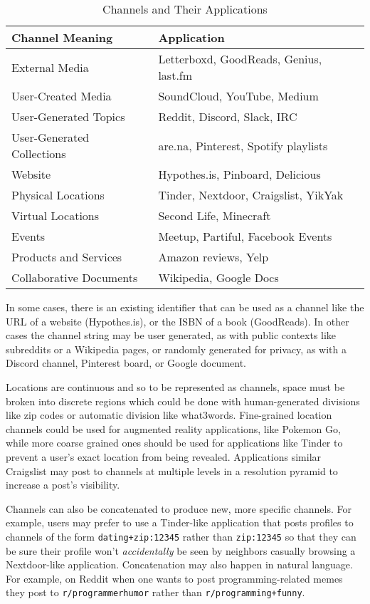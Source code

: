 \begin{table}[h]
    \centering
    \begin{tabular}{|l|l|}
        \hline
        \textbf{Channel Meaning} & \textbf{Application} \\ \hline
        External Media & Letterboxd, GoodReads, Genius, last.fm \\ \hline
        User-Created Media & SoundCloud, YouTube, Medium \\ \hline
        User-Generated Topics & Reddit, Discord, Slack, IRC \\ \hline
        User-Generated Collections & are.na, Pinterest, Spotify playlists \\ \hline
        Website & Hypothes.is, Pinboard, Delicious \\ \hline
        Physical Locations & Tinder, Nextdoor, Craigslist, YikYak \\ \hline
        Virtual Locations & Second Life, Minecraft \\ \hline
        Events & Meetup, Partiful, Facebook Events \\ \hline
        Products and Services & Amazon reviews, Yelp \\ \hline
        Collaborative Documents & Wikipedia, Google Docs \\ \hline
    \end{tabular}
    \caption{Channels and Their Applications}
    \label{concepts:tab:channels}
\end{table}

In some cases, there is an existing identifier that can be used as a channel
like the URL of a website (Hypothes.is),
or the ISBN of a book (GoodReads).
In other cases the channel string may be user generated, as with
public contexts like subreddits or a Wikipedia pages,
or randomly generated for privacy, as with
a Discord channel, Pinterest board, or Google document.

Locations are continuous and so to be represented as channels,
space must be broken into discrete regions which could be done with
human-generated divisions like zip codes or automatic division like
what3words. Fine-grained location channels could be used for
augmented reality applications, like Pokemon Go,
while more coarse grained ones should be used for applications like Tinder
to prevent a user's exact location from being revealed.
Applications similar Craigslist may post to channels at multiple levels in
a resolution pyramid to increase a post's visibility.

Channels can also be concatenated to produce new, more specific channels.
For example, users may prefer to use a Tinder-like application that posts
profiles to channels of the form \texttt{dating+zip:12345} rather than
\texttt{zip:12345} so that they can be sure their profile won't
\emph{accidentally} be seen by neighbors casually browsing a Nextdoor-like application.
Concatenation may also happen in natural language.
For example, on Reddit when one wants to post programming-related memes they post to \texttt{r/programmerhumor} rather than \texttt{r/programming+funny}.

